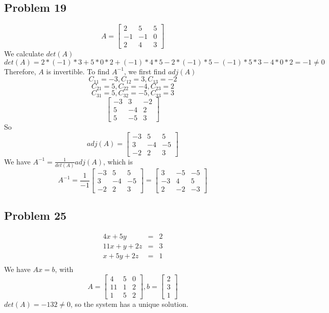 \documentclass[a4paper,12pt]{report}
\begin{document}
\subsection*{Problem 19}
\[
A 
=
\begin{bmatrix}
    2       & 5 & 5 \\
    -1       & -1 & 0 \\
    2       & 4 & 3
\end{bmatrix}
\]
We calculate \(det(A)\)
\[det(A)=2*(-1)*3+5*0*2+(-1)*4*5-2*(-1)*5-(-1)*5*3-4*0*2=-1\neq0\]
Therefore, \(A\) is invertible. To find \(A^{-1}\), we first find \(adj(A)\)
\[C_{11}=-3,C_{12}=3,C_{13}=-2\]
\[C_{21}=5,C_{22}=-4,C_{23}=2\]
\[C_{31}=5,C_{32}=-5,C_{33}=3\]
\[\begin{bmatrix}
    -3       & 3 & -2\\
    5       & -4 & 2 \\
    5       & -5 & 3
\end{bmatrix}
\]
So
\[adj(A)=
\begin{bmatrix}
    -3       & 5 & 5 \\
    3       & -4 & -5 \\
    -2       & 2 & 3
\end{bmatrix}\]
We have \(A^{-1}=\frac{1}{det(A)}adj(A)\), which is
\[A^{-1}=\frac{1}{-1}
\begin{bmatrix}
    -3       & 5 & 5 \\
    3       & -4 & -5 \\
    -2      & 2 & 3
\end{bmatrix}
=\begin{bmatrix}
    3       & -5 & -5 \\
    -3       & 4 & 5 \\
    2       & -2 & -3
\end{bmatrix}
\]

\subsection*{Problem 25}
\begin{eqnarray*}
4x + 5y& = & 2\\
11x + y + 2z& = & 3\\
x+ 5y + 2z & = & 1\\
\end{eqnarray*}
We have \(Ax=b\), with
\[
A=\begin{bmatrix}
    4       & 5 & 0 \\
    11       & 1 & 2 \\
    1       & 5 & 2
\end{bmatrix}, 
b=\begin{bmatrix}
    2        \\
    3       \\
    1       
\end{bmatrix}\]
\(det(A)=-132\neq0\), so the system has a unique solution.
\end{document}
